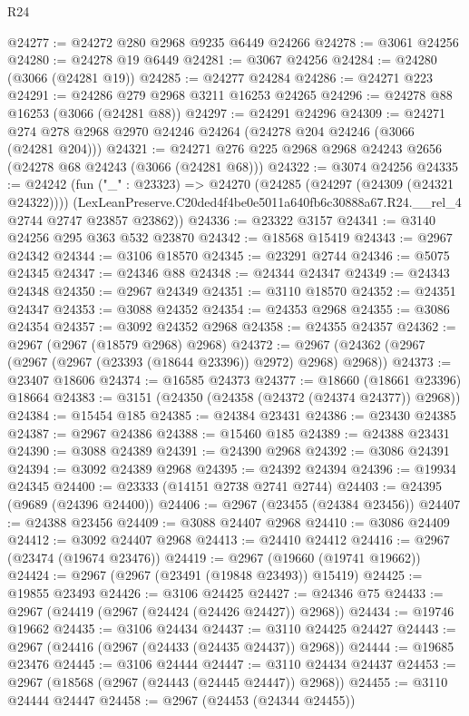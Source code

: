 \begin{lexlean}{R24}
\begin{coremodule}
@24277 := @24272 @280 @2968 @9235 @6449 @24266
@24278 := @3061 @24256
@24280 := @24278 @19 @6449
@24281 := @3067 @24256
@24284 := @24280 (@3066 (@24281 @19))
@24285 := @24277 @24284
@24286 := @24271 @223
@24291 := @24286 @279 @2968 @3211 @16253 @24265
@24296 := @24278 @88 @16253 (@3066 (@24281 @88))
@24297 := @24291 @24296
@24309 := @24271 @274 @278 @2968 @2970 @24246 @24264 (@24278 @204 @24246 (@3066 (@24281 @204)))
@24321 := @24271 @276 @225 @2968 @2968 @24243 @2656 (@24278 @68 @24243 (@3066 (@24281 @68)))
@24322 := @3074 @24256
@24335 := @24242
    (fun ("_" : @23323) =>
    @24270
      (@24285 (@24297 (@24309 (@24321 @24322))))
      (LexLeanPreserve.C20ded4f4be0e5011a640fb6c30888a67.R24.__rel_4 @2744 @2747 @23857 @23862))
@24336 := @23322 @3157
@24341 := @3140 @24256 @295 @363 @532 @23870
@24342 := @18568 @15419
@24343 := @2967 @24342
@24344 := @3106 @18570
@24345 := @23291 @2744
@24346 := @5075 @24345
@24347 := @24346 @88
@24348 := @24344 @24347
@24349 := @24343 @24348
@24350 := @2967 @24349
@24351 := @3110 @18570
@24352 := @24351 @24347
@24353 := @3088 @24352
@24354 := @24353 @2968
@24355 := @3086 @24354
@24357 := @3092 @24352 @2968
@24358 := @24355 @24357
@24362 := @2967 (@2967 (@18579 @2968) @2968)
@24372 := @2967 (@24362 (@2967 (@2967 (@2967 (@23393 (@18644 @23396)) @2972) @2968) @2968))
@24373 := @23407 @18606
@24374 := @16585 @24373
@24377 := @18660 (@18661 @23396) @18664
@24383 := @3151 (@24350 (@24358 (@24372 (@24374 @24377)) @2968))
@24384 := @15454 @185
@24385 := @24384 @23431
@24386 := @23430 @24385
@24387 := @2967 @24386
@24388 := @15460 @185
@24389 := @24388 @23431
@24390 := @3088 @24389
@24391 := @24390 @2968
@24392 := @3086 @24391
@24394 := @3092 @24389 @2968
@24395 := @24392 @24394
@24396 := @19934 @24345
@24400 := @23333 (@14151 @2738 @2741 @2744)
@24403 := @24395 (@9689 (@24396 @24400))
@24406 := @2967 (@23455 (@24384 @23456))
@24407 := @24388 @23456
@24409 := @3088 @24407 @2968
@24410 := @3086 @24409
@24412 := @3092 @24407 @2968
@24413 := @24410 @24412
@24416 := @2967 (@23474 (@19674 @23476))
@24419 := @2967 (@19660 (@19741 @19662))
@24424 := @2967 (@2967 (@23491 (@19848 @23493)) @15419)
@24425 := @19855 @23493
@24426 := @3106 @24425
@24427 := @24346 @75
@24433 := @2967 (@24419 (@2967 (@24424 (@24426 @24427)) @2968))
@24434 := @19746 @19662
@24435 := @3106 @24434
@24437 := @3110 @24425 @24427
@24443 := @2967 (@24416 (@2967 (@24433 (@24435 @24437)) @2968))
@24444 := @19685 @23476
@24445 := @3106 @24444
@24447 := @3110 @24434 @24437
@24453 := @2967 (@18568 (@2967 (@24443 (@24445 @24447)) @2968))
@24455 := @3110 @24444 @24447
@24458 := @2967 (@24453 (@24344 @24455))

\end{coremodule}
\end{lexlean}
